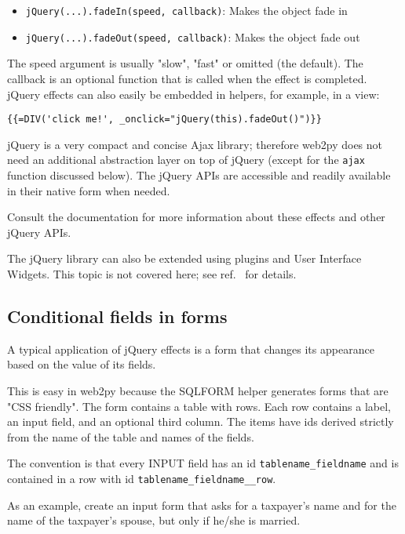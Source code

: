 \documentclass[justified,sixbynine,notoc]{tufte-book}
\def\ft{\small\tt}
\begin{document}
\begin{fullwidth}
\begin{itemize}
\item {\ft jQuery(...).fadeIn(speed, callback)}: Makes the object fade in

\item {\ft jQuery(...).fadeOut(speed, callback)}: Makes the object fade out
\end{itemize}

The speed argument is usually "slow", "fast" or omitted (the default). The callback is an optional function that is called when the effect is completed.
\noindent jQuery effects can also easily be embedded in helpers, for example,
in a view:
\begin{lstlisting}[keywords={}]
{{=DIV('click me!', _onclick="jQuery(this).fadeOut()")}}
\end{lstlisting}
\noindent jQuery is a very compact and concise Ajax library; therefore web2py does not need an additional abstraction layer on top of jQuery (except for the {\ft ajax} function discussed below). The jQuery APIs are accessible and readily available in their native form when needed.

Consult the documentation for more information about these effects and other jQuery APIs.

The jQuery library can also be extended using plugins and User Interface Widgets. This topic is not covered here; see ref.~\cite{jquery-ui} for details.

\goodbreak\subsection{Conditional fields in forms}

A typical application of jQuery effects is a form that changes its appearance based on the value of its fields.

This is easy in web2py because the SQLFORM helper generates forms that are "CSS friendly". The form contains a table with rows. Each row contains a label, an input field, and an optional third column. The items have ids derived strictly from the name of the table and names of the fields.

The convention is that every INPUT field has an id {\ft tablename\_fieldname} and is contained in a row with id {\ft tablename\_fieldname\_\_row}.

As an example, create an input form that asks for a taxpayer's name and for the name of the taxpayer's spouse, but only if he/she is married.


\end{fullwidth}
\end{document}
